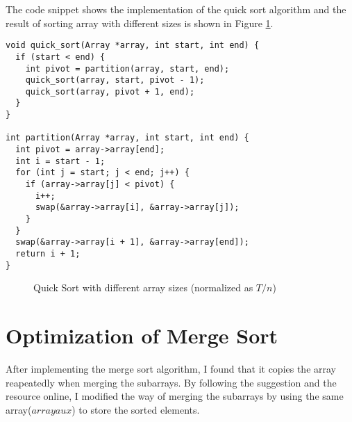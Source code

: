 \documentclass[a4paper,11pt]{article}
\begin{document}
The code snippet shows the implementation of the quick sort algorithm and the result of sorting
array with different sizes is shown in Figure \ref{fig:quick-sort}.

\begin{verbatim}
void quick_sort(Array *array, int start, int end) {
  if (start < end) {
    int pivot = partition(array, start, end);
    quick_sort(array, start, pivot - 1);
    quick_sort(array, pivot + 1, end);
  }
}

int partition(Array *array, int start, int end) {
  int pivot = array->array[end];
  int i = start - 1;
  for (int j = start; j < end; j++) {
    if (array->array[j] < pivot) {
      i++;
      swap(&array->array[i], &array->array[j]);
    }
  }
  swap(&array->array[i + 1], &array->array[end]);
  return i + 1;
}
\end{verbatim}

\begin{figure}[H]
  \centering
  \caption{Quick Sort with different array sizes (normalized as $T/n$)}
  \label{fig:quick-sort}
\end{figure}

\section*{Optimization of Merge Sort}

After implementing the merge sort algorithm, I found that it copies the array reapeatedly
when merging the subarrays. By following the suggestion and the resource online, I modified
the way of merging the subarrays by using the same array($array aux$) to store the sorted elements.
\end{document}

